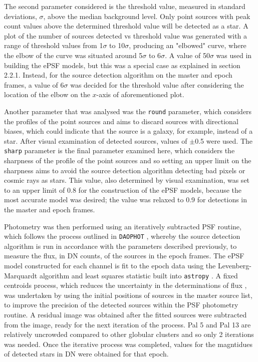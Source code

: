 \documentclass[11pt]{iopart}
\begin{document}
The second parameter considered is the threshold value, measured in standard deviations, $\sigma$, above the median background level. Only point sources with peak count values above the determined threshold value will be detected as a star. A plot of the number of sources detected vs threshold value was generated with a range of threshold values from 1$\sigma$ to 10$\sigma$, producing an "elbowed" curve, where the elbow of the curve was situated around 5$\sigma$ to 6$\sigma$. A value of 50$\sigma$ was used in building the ePSF models, but this was a special case as explained in section 2.2.1. Instead, for the source detection algorithm on the master and epoch frames, a value of 6$\sigma$ was decided for the threshold value after considering the location of the elbow on the $x$-axis of aforementioned plot.

Another parameter that was analysed was the \verb"round" parameter, which considers the profiles of the point sources and aims to discard sources with directional biases, which could indicate that the source is a galaxy, for example, instead of a star. After visual examination of detected sources, values of $\pm$0.5 were used. The \verb"sharp" parameter is the final parameter examined here, which considers the sharpness of the profile of the point sources and so setting an upper limit on the sharpness aims to avoid the source detection algorithm detecting bad pixels or cosmic rays as stars. This value, also determined by visual examination, was set to an upper limit of 0.8 for the construction of the ePSF models, because the most accurate model was desired; the value was relaxed to 0.9 for detections in the master and epoch frames.

Photometry was then performed using an iteratively subtracted PSF routine, which follows the process outlined in \verb"DAOPHOT" \cite{stetson1987}, whereby the source detection algorithm is run in accordance with the parameters described previously, to measure the flux, in DN counts, of the sources in the epoch frames. The ePSF model constructed for each channel is fit to the epoch data using the Levenberg-Marquardt algorithm and least squares statistic built into \verb"astropy" \cite{astropy}. A fixed centroids process, which reduces the uncertainty in the determinations of flux \cite{garofalo2018smhash}, was undertaken by using the initial positions of sources in the master source list, to improve the precision of the detected sources within the PSF photometry routine. A residual image was obtained after the fitted sources were subtracted from the image, ready for the next iteration of the process. Pal 5 and Pal 13 are relatively uncrowded compared to other globular clusters and so only 2 iterations was needed. Once the iterative process was completed, values for the magntidues of detected stars in DN were obtained for that epoch.
\end{document}
